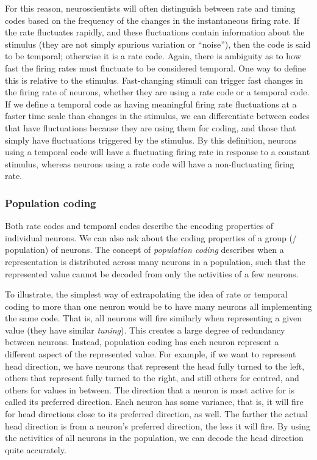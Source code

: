 For this reason, neuroscientists will often distinguish
between rate and timing codes
based on the frequency of the changes in the instantaneous firing rate.
If the rate fluctuates rapidly,
and these fluctuations contain information about the stimulus
(they are not simply spurious variation or ``noise''),
then the code is said to be temporal; otherwise it is a rate code.
Again, there is ambiguity as to how fast the firing rates must fluctuate
to be considered temporal.
One way to define this is relative to the stimulus.
Fast-changing stimuli can trigger fast changes in the firing rate of neurons,
whether they are using a rate code or a temporal code.
If we define a temporal code as having meaningful firing rate fluctuations
at a faster time scale than changes in the stimulus,
we can differentiate between codes that have fluctuations
because they are using them for coding,
and those that simply have fluctuations triggered by the stimulus.
By this definition,
neurons using a temporal code will have a fluctuating firing rate
in response to a constant stimulus,
whereas neurons using a rate code will have a non-fluctuating firing rate.


\subsubsection{Population coding}

Both rate codes and temporal codes describe
the encoding properties of individual neurons.
We can also ask about the coding properties
of a group (\aka/ population) of neurons.
The concept of \emph{population coding} describes when a representation
is distributed across many neurons in a population,
such that the represented value cannot be decoded from only the activities
of a few neurons.

To illustrate, the simplest way of extrapolating the idea of rate or temporal
coding to more than one neuron
would be to have many neurons all implementing the same code.
That is, all neurons will fire similarly when representing a given value
(they have similar \emph{tuning}).
This creates a large degree of redundancy between neurons.
Instead, population coding has each neuron represent a different aspect
of the represented value.
For example, if we want to represent head direction,
we have neurons that represent the head fully turned to the left,
others that represent fully turned to the right,
and still others for centred, and others for values in between.
The direction that a neuron is most active for is called its preferred direction.
Each neuron has some variance, that is, it will fire for head directions
close to its preferred direction, as well.
The farther the actual head direction is from a neuron's preferred direction,
the less it will fire.
By using the activities of all neurons in the population,
we can decode the head direction quite accurately.

